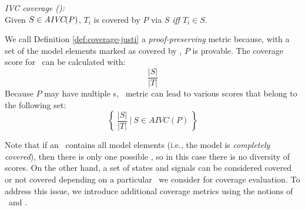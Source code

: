 
\begin{definition} {\emph{IVC coverage (\ivccov):}} \\
\label{def:coverage-justi}
Given $S \in \textit{AIVC}(P)$, $T_i$ is covered by $P$ via $S$ \emph{iff} $T_i \in S$.
\end{definition}

We call Definition \ref{def:coverage-justi} a \emph{proof-preserving} metric because, with a set of the model elements marked as covered by \ivccov ,
$P$ is provable.  %
The coverage score for \ivccov\ can be calculated with: $$\frac{|S|}{|T|}$$
Because $P$ may have multiple \mivc s,
  \ivccov\ metric can lead to various scores that belong to the following set:
\[
\left\{~\frac{ |S|}{|T|}~\bigg|~S \in AIVC(P)~\right\}
\]

\noindent Note that if an \mivc ~contains all model elements (i.e., the model is {\em completely covered}), then there is only one possible \mivc , so in this case there is no diversity of scores. On the other hand, a set of states and signals can be considered covered or not covered depending on a particular \mivc\ we consider for coverage evaluation. To address this issue, we introduce additional coverage metrics using the notions of \may\ and \must.


